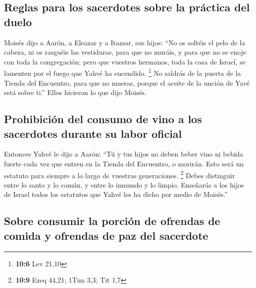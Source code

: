 \hypertarget{reglas-para-los-sacerdotes-sobre-la-pruxe1ctica-del-duelo}{%
\subsection{Reglas para los sacerdotes sobre la práctica del
duelo}\label{reglas-para-los-sacerdotes-sobre-la-pruxe1ctica-del-duelo}}

 Moisés dijo a Aarón, a Eleazar y a Itamar, sus hijos:
``No os soltéis el pelo de la cabeza, ni os rasguéis las vestiduras,
para que no muráis, y para que no se enoje con toda la congregación;
pero que vuestros hermanos, toda la casa de Israel, se lamenten por el
fuego que Yahvé ha encendido. \footnote{\textbf{10:6} Lev 21,10}
 No saldrás de la puerta de la Tienda del Encuentro, para
que no mueras, porque el aceite de la unción de Yavé está sobre ti.''
Ellos hicieron lo que dijo Moisés.

\hypertarget{prohibiciuxf3n-del-consumo-de-vino-a-los-sacerdotes-durante-su-labor-oficial}{%
\subsection{Prohibición del consumo de vino a los sacerdotes durante su
labor
oficial}\label{prohibiciuxf3n-del-consumo-de-vino-a-los-sacerdotes-durante-su-labor-oficial}}

 Entonces Yahvé le dijo a Aarón:  ``Tú y tus
hijos no deben beber vino ni bebida fuerte cada vez que entren en la
Tienda del Encuentro, o morirán. Esto será un estatuto para siempre a lo
largo de vuestras generaciones. \footnote{\textbf{10:9} Ezeq 44,21; 1Tim
  3,3; Tit 1,7}  Debes distinguir entre lo santo y lo
común, y entre lo inmundo y lo limpio.  Enseñarás a los
hijos de Israel todos los estatutos que Yahvé les ha dicho por medio de
Moisés.''

\hypertarget{sobre-consumir-la-porciuxf3n-de-ofrendas-de-comida-y-ofrendas-de-paz-del-sacerdote}{%
\subsection{Sobre consumir la porción de ofrendas de comida y ofrendas
de paz del
sacerdote}\label{sobre-consumir-la-porciuxf3n-de-ofrendas-de-comida-y-ofrendas-de-paz-del-sacerdote}}

